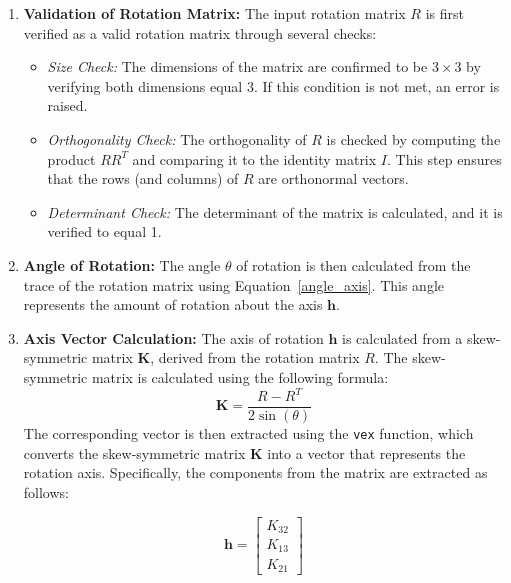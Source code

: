 \begin{enumerate}
    \item \textbf{Validation of Rotation Matrix:}
    The input rotation matrix \( R \) is first verified as a valid rotation matrix through several checks:
    \begin{itemize}
        \item \textit{Size Check:} The dimensions of the matrix are confirmed to be \( 3 \times 3 \) by verifying both dimensions equal 3. If this condition is not met, an error is raised.
        
        \item \textit{Orthogonality Check:} The orthogonality of \( R \) is checked by computing the product \( R R^T \) and comparing it to the identity matrix \( I \). This step ensures that the rows (and columns) of \( R \) are orthonormal vectors.
        
        \item \textit{Determinant Check:} The determinant of the matrix is calculated, and it is verified to equal 1.
    \end{itemize}

    \item \textbf{Angle of Rotation:}
    The angle \( \theta \) of rotation is then calculated from the trace of the rotation matrix using Equation~\ref{angle_axis}. This angle represents the amount of rotation about the axis \( \mathbf{h} \).

    \item \textbf{Axis Vector Calculation:}
    The axis of rotation \( \mathbf{h} \) is calculated from a skew-symmetric matrix \( \mathbf{K} \), derived from the rotation matrix \( R \). The skew-symmetric matrix is calculated using the following formula:
    \begin{equation} \label{skew_symmetric}
    \mathbf{K} = \frac{R - R^T}{2 \sin(\theta)}
    \end{equation}
    The corresponding vector is then extracted using the \texttt{vex} function, which converts the skew-symmetric matrix \( \mathbf{K} \) into a vector that represents the rotation axis. Specifically, the components from the matrix are extracted as follows:
    
    \begin{equation}
    \mathbf{h} = \begin{bmatrix}
    K_{32} \\
    K_{13} \\
    K_{21}
    \end{bmatrix}
    \end{equation}
    

\end{enumerate}
